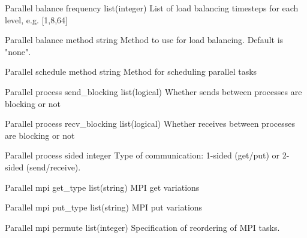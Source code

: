 \documentclass{article}
\begin{document}
\Parameter
{Parallel}
{balance}
{frequency}
{list(integer)}
{}
{List of load balancing timesteps for each level, e.g. [1,8,64]}
{}
{}

\Parameter
{Parallel}
{balance}
{method}
{string}
{}
{Method to use for load balancing. Default is "none".}
{}
{}

\Parameter
{Parallel}
{schedule}
{method}
{string}
{}
{Method for scheduling parallel tasks}
{}
{}

\Parameter
{Parallel}
{process}
{send\_blocking}
{list(logical)}
{}
{ Whether sends between processes are blocking or not}
{}
{}

\Parameter
{Parallel}
{process}
{recv\_blocking}
{list(logical)}
{}
{ Whether receives between processes are blocking or not}
{}
{}

\Parameter
{Parallel}
{process}
{sided}
{integer}
{}
{Type of communication: 1-sided (get/put) or 2-sided (send/receive). }
{}
{}


\Parameter
{Parallel}
{mpi}
{get\_type}
{list(string)}
{}
{MPI get variations}
{}
{}

\Parameter
{Parallel}
{mpi}
{put\_type}
{list(string)}
{}
{MPI put variations}
{}
{}

\Parameter
{Parallel}
{mpi}
{permute}
{list(integer)}
{}
{Specification of reordering of MPI tasks. }
{}
{}
\end{document}
